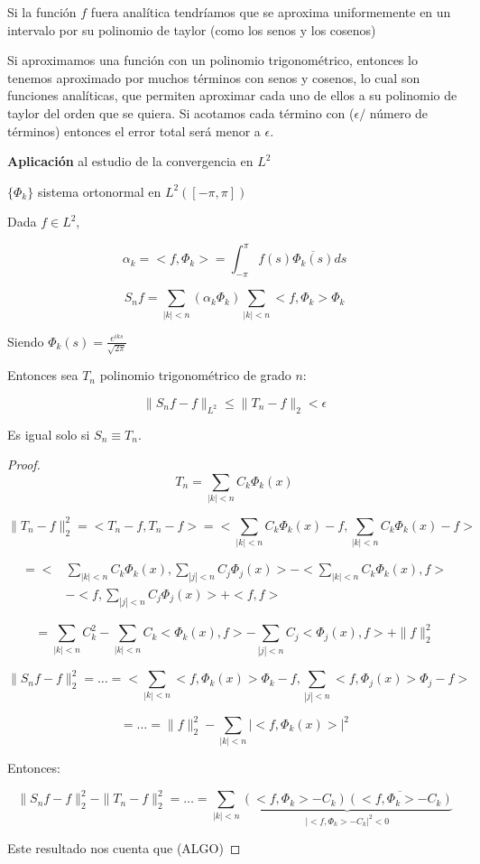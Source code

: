		Si la función $f$ fuera analítica tendríamos que se aproxima uniformemente en un intervalo por su polinomio de taylor (como los senos y los cosenos)

		Si aproximamos una función con un polinomio trigonométrico, entonces lo tenemos aproximado por muchos términos con senos y cosenos, lo cual son funciones analíticas, que permiten aproximar cada uno de ellos a su polinomio de taylor del orden que se quiera. Si acotamos cada término con ($\epsilon / $ número de términos) entonces el error total será menor a $\epsilon$.


		\textbf{Aplicación} al estudio de la convergencia en $L^2$

		$\{\Phi_k\}$ sistema ortonormal en $L^2([-\pi,\pi])$

		Dada $f \in L^2$,

		\[\alpha_k = <f, \Phi_{k}> = \int_{-\pi}^\pi f(s) \overline{\Phi_k(s)} ds  \]

		\[  S_n f = \sum_{|k| < n} (\alpha_k \Phi_k ) \sum_{|k| < n}<f, \Phi_k >\Phi_k \]

		Siendo $\Phi_k(s) = \frac{e^{iks}}{\sqrt{2\pi}}$

		\begin{theorem}

			Entonces sea $T_n$ polinomio trigonométrico de grado $n$:

			\[ \| S_n f - f\|_{L^2} \leq \| T_n - f \|_2 < \epsilon \]

			Es igual solo si $S_n \equiv T_n$.


			\begin{proof}

				\[ T_n = \sum_{|k| < n} C_k \Phi_k(x) \]

				\[ \| T_n - f \|_{2}^2 = < T_n -f, T_n - f> = < \sum_{|k| < n} C_k \Phi_k(x) - f, \sum_{|k| < n} C_k \Phi_k(x) - f >   \]

				\begin{align*} = < &\sum_{|k| < n} C_k \Phi_k(x), \sum_{|j| < n} C_j \Phi_j(x) > - < \sum_{|k| < n} C_k \Phi_k(x), f> \\ &- <f, \sum_{|j| < n} C_j \Phi_j(x)> + <f,f> \end{align*}

				\[ = \sum_{|k| < n} C_k^2 - \sum_{|k| < n} C_k <\Phi_k(x),f> - \sum_{|j| < n} C_j <\Phi_j(x),f> + \|f\|_2^2  \]


				\[ \| S_n f - f \|_2^2 = … = < \sum_{|k| < n} <f,\Phi_k(x)> \Phi_k -f,  \sum_{|j| < n} <f,\Phi_j(x)> \Phi_j -f>\]

				\[ = … = \|f\|_2^2 - \sum_{|k| < n} |<f,\Phi_k(x)>|^2 \]

				Entonces:

				\[ \| S_n f - f \|_2^2 - \|T_n -f\|_2^2 = … = \sum_{|k| < n} \underbrace{(<f,\Phi_k> - C_k) \overline{(<f,\Phi_k> - C_k)}}_{|<f, \Phi_k> - C_k|^2 < 0}  \]


				Este resultado nos cuenta que (ALGO)
			\end{proof}

		\end{theorem}

